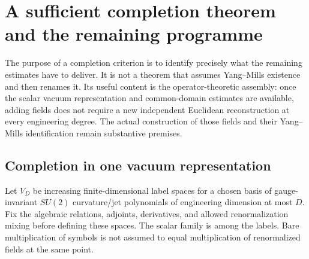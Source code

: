 \section{A sufficient completion theorem and the remaining programme}
\label{sec:completion}

The purpose of a completion criterion is to identify precisely what the
remaining estimates have to deliver. It is not a theorem that assumes
Yang--Mills existence and then renames it. Its useful content is the
operator-theoretic assembly: once the scalar vacuum representation and
common-domain estimates are available, adding fields does not require
a new independent Euclidean reconstruction at every engineering degree.
The actual construction of those fields and their Yang--Mills
identification remain substantive premises.

\subsection{Completion in one vacuum representation}

Let \(V_D\) be increasing finite-dimensional label spaces for a chosen
basis of gauge-invariant \(SU(2)\) curvature/jet polynomials of engineering
dimension at most \(D\). Fix the algebraic relations, adjoints,
derivatives, and allowed renormalization mixing before defining these
spaces. The scalar family is among the labels. Bare multiplication of
symbols is not assumed to equal multiplication of renormalized fields at
the same point.

